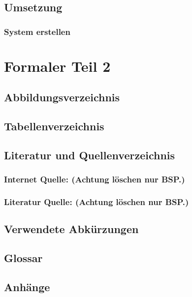 \documentclass{report}
\begin{document}
\chapter{Umsetzung}
\section{System erstellen}

\part{Formaler Teil 2}
\chapter{Abbildungsverzeichnis}

\chapter{Tabellenverzeichnis}

\chapter{Literatur und Quellenverzeichnis}
\section{Internet Quelle: (Achtung löschen nur BSP.)}
\section{Literatur Quelle: (Achtung löschen nur BSP.)}

\chapter{Verwendete Abkürzungen}

\chapter{Glossar}

\chapter{Anhänge}
\end{document}
